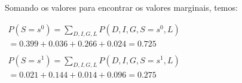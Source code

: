 Somando os valores para encontrar os valores marginais, temos:

$\begin{array}{l}
\displaystyle P(S = {s^0}) = \sum\limits_{D,I,G,L} {P(D,I,G,S = {s^0},L)} \\
\displaystyle = 0.399 + 0.036 + 0.266 + 0.024 = 0.725\\ \\
\displaystyle P(S = {s^1}) = \sum\limits_{D,I,G,L} {P(D,I,G,S = {s^1},L)} \\
\displaystyle = 0.021 + 0.144 + 0.014 + 0.096 = 0.275
\end{array}$